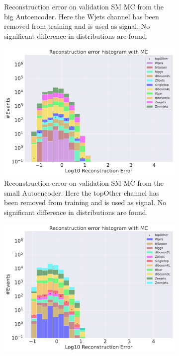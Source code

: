 \begin{figure}[h!]
\begin{subfigure}{.45\textwidth}
        \caption{Reconstruction error on validation SM MC from the big Autoencoder. Here the Wjets channel has been removed from training and 
        is used as signal. No significant difference in distributions are found. }
        \label{fig:vae_big_Wjets}
    \end{subfigure}
    \hfill 
    \begin{subfigure}{.45\textwidth}
        \includegraphics[width=\textwidth]{Figures/VAE_testing/small/b_data_recon_big_rm3_feats_sig_topOther.pdf}
        \caption{Reconstruction error on validation SM MC from the small Autoencoder. Here the topOther channel has been removed from training and 
        is used as signal. No significant difference in distributions are found. }
        \label{fig:vae_small_topOther}
    \end{subfigure}
    \hfill
    \begin{subfigure}{.45\textwidth}
        \includegraphics[width=\textwidth]{Figures/VAE_testing/big/b_data_recon_big_rm3_feats_sig_topOther.pdf}

\end{subfigure}
\end{figure}
